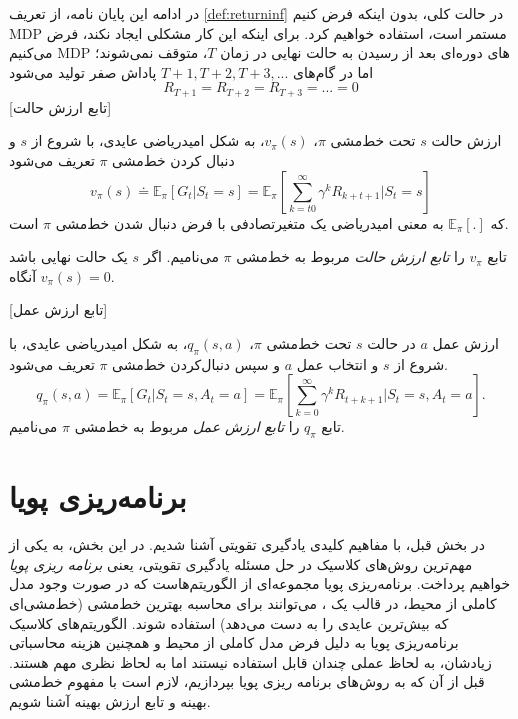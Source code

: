 در ادامه این پایان نامه، از تعریف 
\ref{def:returninf}
در حالت کلی، بدون اینکه فرض کنیم MDP مستمر است، استفاده خواهیم کرد. برای اینکه این کار مشکلی ایجاد نکند، فرض می‌کنیم MDP های دوره‌ای بعد از رسیدن به حالت نهایی در زمان $T$، متوقف نمی‌شوند؛ اما در گام‌های 
$T+1, T+2, T+3, ...$
پاداش صفر تولید می‌شود
$$R_{T+1} = R_{T+2} = R_{T+3} = ... = 0$$
[تابع ارزش حالت]

 ارزش حالت  $s$ تحت خط‌مشی 
 $\pi$،
 $v_\pi(s)$،
  به شکل امیدریاضی عایدی، با شروع از $s$ و دنبال کردن خط‌مشی $\pi$ تعریف می‌شود
$$v_\pi(s) \doteq \mathbb{E}_\pi\left[G_t| S_t=s\right] = \mathbb{E}_\pi\left[\sum_{k=t0}^{\infty} \gamma^{k} R_{k+t+1}|S_t =s \right]$$
که $\mathbb{E}_\pi[.]$
به معنی امیدریاضی  یک متغیرتصادفی با فرض دنبال شدن خط‌مشی $\pi$ است.

تابع $v_\pi$ را 
\textit{تابع ارزش حالت} مربوط به خط‌مشی 
$\pi$
می‌نامیم. اگر $s$ یک حالت نهایی باشد آنگاه 
$v_\pi(s) = 0$.


\label{statevaluedef}

[تابع ارزش عمل]

ارزش عمل  $a$ در حالت
$s$
 تحت خط‌مشی 
$\pi$،
$q_\pi(s,a)$،
  به شکل امیدریاضی عایدی، با شروع از $s$ و انتخاب عمل $a$  و سپس دنبال‌کردن خط‌مشی $\pi$ تعریف می‌شود.
$$q_\pi(s,a) = \mathbb{E}_\pi\left[G_t| S_t=s, A_t=a\right] = \mathbb{E}_\pi\left[\sum_{k=0}^{\infty} \gamma^k R_{t+k+1}|S_t =s, A_t=a \right].$$
تابع $q_\pi$ را 
\textit{تابع ارزش عمل}
 مربوط به خط‌مشی 
$\pi$
می‌نامیم.
\section{برنامه‌ریزی پویا}
در بخش قبل، با مفاهیم کلیدی یادگیری تقویتی آشنا شدیم. در این بخش، به یکی از مهم‌ترین روش‌های کلاسیک در حل مسئله یادگیری تقویتی، یعنی 
\textit{برنامه ریزی پویا}
خواهیم پرداخت. برنامه‌ریزی پویا
 مجموعه‌ای از الگوریتم‌هاست  که در صورت وجود مدل کاملی از محیط، در قالب یک 
،
 می‌توانند برای محاسبه بهترین خط‌مشی (خط‌مشی‌ای که بیش‌ترین عایدی را به دست می‌دهد) استفاده شوند.
الگوریتم‌های کلاسیک برنامه‌ریزی پویا به دلیل فرض
مدل کاملی از محیط و همچنین هزینه محاسباتی زیادشان، به لحاظ عملی چندان قابل استفاده نیستند اما به لحاظ نظری مهم هستند. قبل از آن که به روش‌های برنامه ریزی پویا بپردازیم، لازم است با مفهوم خط‌مشی بهینه و تابع ارزش بهینه آشنا شویم.
